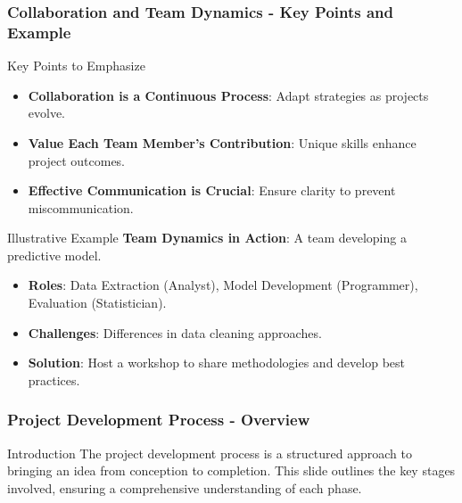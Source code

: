 \documentclass{beamer}
\begin{document}
\begin{frame}[fragile]
    \frametitle{Collaboration and Team Dynamics - Key Points and Example}
    \begin{block}{Key Points to Emphasize}
        \begin{itemize}
            \item \textbf{Collaboration is a Continuous Process}: Adapt strategies as projects evolve.
            \item \textbf{Value Each Team Member's Contribution}: Unique skills enhance project outcomes.
            \item \textbf{Effective Communication is Crucial}: Ensure clarity to prevent miscommunication.
        \end{itemize}
    \end{block}
    
    \begin{block}{Illustrative Example}
        \textbf{Team Dynamics in Action}: A team developing a predictive model.
        \begin{itemize}
            \item \textbf{Roles}: Data Extraction (Analyst), Model Development (Programmer), Evaluation (Statistician).
            \item \textbf{Challenges}: Differences in data cleaning approaches.
            \item \textbf{Solution}: Host a workshop to share methodologies and develop best practices.
        \end{itemize}
    \end{block}
\end{frame}

\begin{frame}[fragile]
    \frametitle{Project Development Process - Overview}
    \begin{block}{Introduction}
        The project development process is a structured approach to bringing an idea from conception to completion. This slide outlines the key stages involved, ensuring a comprehensive understanding of each phase.
    \end{block}
\end{frame}
\end{document}

